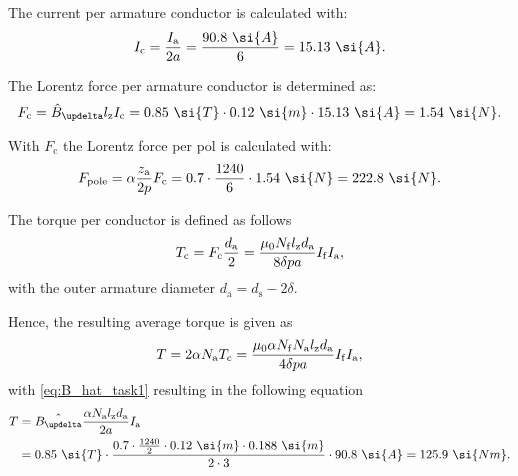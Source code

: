 \begin{solutionblock}
    The current per armature conductor is calculated with:
    \begin{equation}
        I_{\mathrm{c}} = \frac{\Ia}{2a}
        = \frac{90.8 \ \si{A}}{6}
        = 15.13 \ \si{A}.
    \end{equation}

    The Lorentz force per armature conductor is determined as:
    \begin{equation}
        F_{\mathrm{c}} = \hat{B}_{\updelta} \lz I_{\mathrm{c}}
        = 0.85 \ \si{T} \cdot 0.12 \ \si{m} \cdot 15.13 \ \si{A}
        = 1.54 \ \si{N}.
    \end{equation}

    With $F_{\mathrm{c}}$ the Lorentz force per pol is calculated with:
    \begin{equation}
        F_{\mathrm{pole}} = \alpha \frac{\za}{2p} F_{\mathrm{c}}
        = 0.7 \cdot \frac{1240}{6} \cdot 1.54 \ \si{N}
        = 222.8 \ \si{N}.
    \end{equation}


    The torque per conductor is defined as follows 
    \begin{equation}
        T_{\mathrm{c}} = F_{\mathrm{c}} \frac{d_{\mathrm{a}}}{2}
        = \frac{\mu_{\mathrm{0}} N_{\mathrm{f}} l_{\mathrm{z}} d_{\mathrm{a}}}{8\delta p a} I_{\mathrm{f}}I_{\mathrm{a}},
    \end{equation}
    with the outer armature diameter $d_{\mathrm{a}} = d_{\mathrm{s}} - 2\delta$.

    Hence, the resulting average torque is given as
    \begin{equation}
        T = 2 \alpha N_{\mathrm{a}} T_{\mathrm{c}}
        = \frac{\mu_{\mathrm{0}} \alpha N_{\mathrm{f}} N_{\mathrm{a}} l_{\mathrm{z}} d_{\mathrm{a}}}{4 \delta p a} I_{\mathrm{f}} I_{\mathrm{a}},
    \end{equation}
    with \eqref{eq:B_hat_task1} resulting in the following equation
    \begin{align}
        \begin{split}
            T &= \hat{B_{\updelta}} \frac{\alpha N_{\mathrm{a}} \lz d_{\mathrm{a}}}{2a} \Ia\\
            &= 0.85 \ \si{T} \cdot \frac{0.7 \cdot \frac{1240}{2} \cdot 0.12 \ \si{m} \cdot 0.188 \ \si{m}}{2 \cdot 3} \cdot 90.8 \ \si{A}
            = 125.9 \ \si{Nm}.
        \end{split}
    \end{align}

   

\end{solutionblock}



